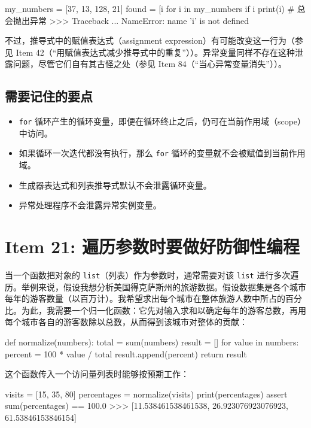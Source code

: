 \begin{codebox}[python]
my_numbers = [37, 13, 128, 21]
found = [i for i in my_numbers if i %
print(i)  # 总会抛出异常
>>>
Traceback ...
NameError: name 'i' is not defined
\end{codebox}

不过，推导式中的赋值表达式（assignment expression）有可能改变这一行为（参见 Item 42（``用赋值表达式减少推导式中的重复''））。异常变量同样不存在这种泄露问题，尽管它们自有其古怪之处（参见 Item 84（``当心异常变量消失''））。

\subsection{需要记住的要点}

\begin{itemize}
\item \texttt{for} 循环产生的循环变量，即便在循环终止之后，仍可在当前作用域（scope）中访问。
\item 如果循环一次迭代都没有执行，那么 \texttt{for} 循环的变量就不会被赋值到当前作用域。
\item 生成器表达式和列表推导式默认不会泄露循环变量。
\item 异常处理程序不会泄露异常实例变量。
\end{itemize}

\section{Item 21: 遍历参数时要做好防御性编程}

当一个函数把对象的 \texttt{list}（列表）作为参数时，通常需要对该 \texttt{list} 进行多次遍历。举例来说，假设我想分析美国得克萨斯州的旅游数据。假设数据集是各个城市每年的游客数量（以百万计）。我希望求出每个城市在整体旅游人数中所占的百分比。为此，我需要一个归一化函数：它先对输入求和以确定每年的游客总数，再用每个城市各自的游客数除以总数，从而得到该城市对整体的贡献：

\begin{codebox}[python]
def normalize(numbers):
    total = sum(numbers)
    result = []
    for value in numbers:
        percent = 100 * value / total
        result.append(percent)
    return result
\end{codebox}

这个函数传入一个访问量列表时能够按预期工作：

\begin{codebox}[python]
visits = [15, 35, 80]
percentages = normalize(visits)
print(percentages)
assert sum(percentages) == 100.0
>>>
[11.538461538461538, 26.923076923076923, 61.53846153846154]
\end{codebox}


